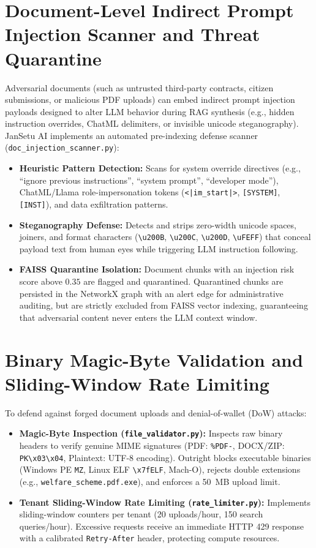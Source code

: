 \documentclass[12pt,a4paper,oneside]{report}
\begin{document}
\section{Document-Level Indirect Prompt Injection Scanner and Threat Quarantine}
Adversarial documents (such as untrusted third-party contracts, citizen submissions, or malicious PDF uploads) can embed indirect prompt injection payloads designed to alter LLM behavior during RAG synthesis (e.g., hidden instruction overrides, ChatML delimiters, or invisible unicode steganography). JanSetu AI implements an automated pre-indexing defense scanner (\texttt{doc\_injection\_scanner.py}):
\begin{itemize}[itemsep=2pt]
    \item \textbf{Heuristic Pattern Detection:} Scans for system override directives (e.g., ``ignore previous instructions'', ``system prompt'', ``developer mode''), ChatML/Llama role-impersonation tokens (\texttt{<|im\_start|>}, \texttt{[SYSTEM]}, \texttt{[INST]}), and data exfiltration patterns.
    \item \textbf{Steganography Defense:} Detects and strips zero-width unicode spaces, joiners, and format characters (\texttt{\textbackslash u200B}, \texttt{\textbackslash u200C}, \texttt{\textbackslash u200D}, \texttt{\textbackslash uFEFF}) that conceal payload text from human eyes while triggering LLM instruction following.
    \item \textbf{FAISS Quarantine Isolation:} Document chunks with an injection risk score above $0.35$ are flagged and quarantined. Quarantined chunks are persisted in the NetworkX graph with an alert edge for administrative auditing, but are strictly excluded from FAISS vector indexing, guaranteeing that adversarial content never enters the LLM context window.
\end{itemize}

\section{Binary Magic-Byte Validation and Sliding-Window Rate Limiting}
To defend against forged document uploads and denial-of-wallet (DoW) attacks:
\begin{itemize}[itemsep=2pt]
    \item \textbf{Magic-Byte Inspection (\texttt{file\_validator.py}):} Inspects raw binary headers to verify genuine MIME signatures (PDF: \texttt{\%PDF-}, DOCX/ZIP: \texttt{PK\textbackslash x03\textbackslash x04}, Plaintext: UTF-8 encoding). Outright blocks executable binaries (Windows PE \texttt{MZ}, Linux ELF \texttt{\textbackslash x7fELF}, Mach-O), rejects double extensions (e.g., \texttt{welfare\_scheme.pdf.exe}), and enforces a 50~MB upload limit.
    \item \textbf{Tenant Sliding-Window Rate Limiting (\texttt{rate\_limiter.py}):} Implements sliding-window counters per tenant (20 uploads/hour, 150 search queries/hour). Excessive requests receive an immediate HTTP 429 response with a calibrated \texttt{Retry-After} header, protecting compute resources.
\end{itemize}
\end{document}
